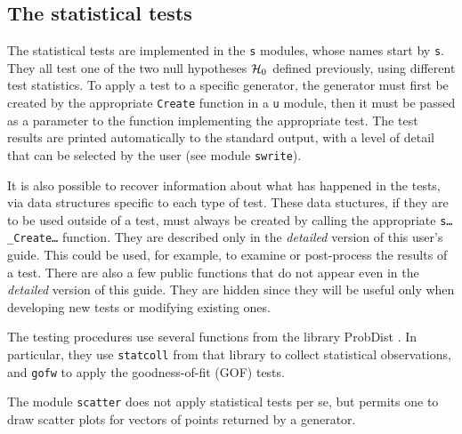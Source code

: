 \subsection {The statistical tests}

The statistical tests are implemented in the {\tt s} modules, 
whose names start by {\tt s}.  
They all test one of the two null hypotheses $\mathcal{H}_0$ defined
previously, using different test statistics.
To apply a test to a specific generator, the generator must first be
created by the appropriate {\tt Create} function in a {\tt u} module,
then it must be passed as a parameter to the function 
implementing the appropriate test.
 The test results are printed automatically
to the standard output, with a level of detail that can be selected 
by the user (see module {\tt swrite}).

It is also possible to recover information about what has happened 
in the tests, via data structures specific to each type of test.
These data stuctures, if they are to be used outside of a test,
must always be created by calling the appropriate
{\tt s\ldots\_Create\ldots} function. They 
 are described only in the {\em detailed\/} version of this
user's guide. This could be used, for example, to examine or 
post-process the results of a test.
There are also a few public functions that do not appear even 
in the {\em detailed\/} version of this guide. They are hidden since
they will be useful only when developing new tests or modifying 
existing ones.

The testing procedures use several functions from the library ProbDist
\cite{iLEC01p}.  In particular, they use {\tt statcoll} from that library
to collect statistical observations, and {\tt gofw} to apply the
goodness-of-fit (GOF) tests.

The module {\tt scatter} does not apply statistical tests per se,
but permits one to draw scatter plots for vectors of points
returned by a generator.

